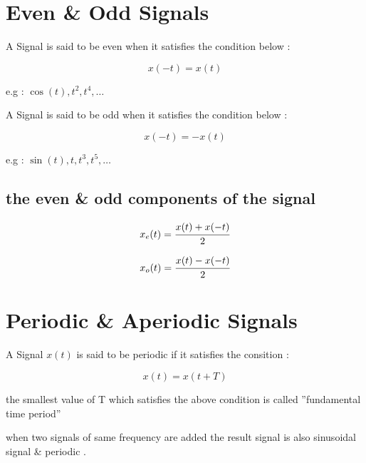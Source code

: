 \documentclass[12pt]{article}
\begin{document}
\section{Even \& Odd Signals}



A Signal is said to be even when it satisfies the condition below :

$$
x(-t) = x(t)
$$

e.g : $\cos{(t)} , t^{2} , t^{4}  , \dots$


\noindent
A Signal is said to be odd when it satisfies the condition below :


$$
x(-t) = -x(t)
$$


e.g : $\sin{(t)} , t , t^{3} , t^{5} , \dots$





\subsection{the even \& odd components of the signal}




\begin{align*}
x_{e}(t) = \cfrac{x(t) + x(-t)}{2}
\end{align*}



\begin{align*}
x_{o}(t) = \cfrac{x(t) - x(-t)}{2}
\end{align*}







\section{Periodic \& Aperiodic Signals}



A Signal $x(t)$ is said to be periodic if it satisfies the consition : 

$$
x(t) = x(t+T)
$$



\noindent
the smallest value of T which satisfies the above condition is called ''fundamental time period''
\newline\newline



\noindent
when two signals of same frequency are added the result signal is also sinusoidal signal \& periodic .
\newline\newline
\end{document}
